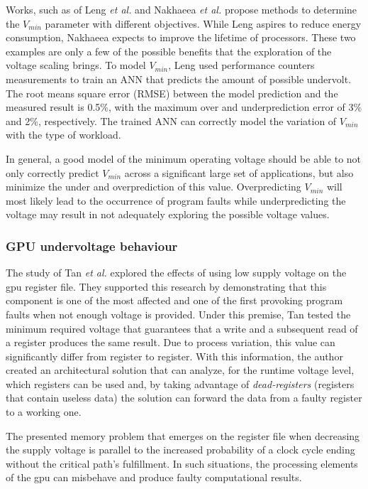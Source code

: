 Works, such as of Leng \textit{et al.} \cite{leng_safe_2015} and Nakhaeea  \textit{et al.} \cite{nakhaee_lifetime_2018} propose methods to determine the $V_{min}$ parameter with different objectives. While Leng aspires to reduce energy consumption, Nakhaeea expects to improve the lifetime of processors. These two examples are only a few of the possible benefits that the exploration of the voltage scaling brings. To model $V_{min}$, Leng used performance counters measurements to train an ANN that predicts the amount of possible undervolt. The root means square error (RMSE) between the model prediction and the measured result is 0.5\%, with the maximum over and underprediction error of 3\% and 2\%, respectively. The trained ANN can correctly model the variation of $V_{min}$ with the type of workload.

In general, a good model of the minimum operating voltage should be able to not only correctly predict  $V_{min}$ across a significant large set of applications, but also minimize the under and overprediction of this value. Overpredicting $V_{min}$ will most likely lead to the occurrence of program faults while underpredicting the voltage may result in not adequately exploring the possible voltage values.

\subsubsection{GPU undervoltage behaviour}

The study of Tan \textit{et al.} \cite{tan_combating_2016} explored the effects of using low supply voltage on the \acrshort{gpu} register file. They supported this research by demonstrating that this component is one of the most affected and one of the first provoking program faults when not enough voltage is provided. Under this premise, Tan tested the minimum required voltage that guarantees that a write and a subsequent read of a register produces the same result. Due to process variation, this value can significantly differ from register to register. With this information, the author created an architectural solution that can analyze, for the runtime voltage level, which registers can be used and, by taking advantage of \textit{dead-registers} (registers that contain useless data) the solution can forward the data from a faulty register to a working one.

The presented memory problem that emerges on the register file when decreasing the supply voltage is parallel to the increased probability of a clock cycle ending without the critical path's fulfillment. In such situations, the processing elements of the \acrshort{gpu} can misbehave and produce faulty computational results.


